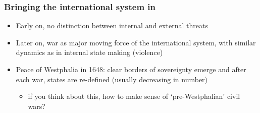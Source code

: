 \documentclass[aspectratio=43]{beamer}
\begin{document}


\begin{frame}
\frametitle{Bringing the international system in}
\centering

\begin{itemize}
  \item Early on, no distinction between internal and external threats
  \item Later on, war as major moving force of the international system, with similar dynamics as in internal state making (violence)
  \item Peace of Westphalia in 1648: clear borders of sovereignty emerge and after each war, states are re-defined (usually decreasing in number)
  \begin{itemize}
    \item if you think about this, how to make sense of `pre-Westphalian' civil wars?
  \end{itemize}
\end{itemize}

\end{frame}

%
%
\end{document}
